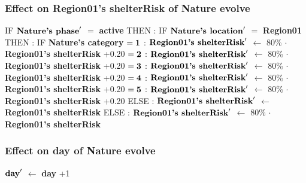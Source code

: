 \documentclass{article}%
\begin{document}
\subsubsection{Effect on Region01's shelterRisk of Nature evolve}%
\label{ssubsec:Effect on Region01's shelterRisk of Nature evolve}%
\begin{flushleft}%
IF %
$\mbox{\textbf{Nature's phase}} '$%
$=$%
\textbf{active}%
\linebreak%
\hspace*{2em}%
THEN %
: %
IF %
$\mbox{\textbf{Nature's location}} '$%
$=$%
\textbf{Region01}%
\linebreak%
\hspace*{4em}%
THEN %
: %
IF %
\textbf{Nature's category}%
\linebreak%
\hspace*{6em}%
$= \mbox{\textbf{1}}$%
: %
$\mbox{\textbf{Region01's shelterRisk}} '$%
$\leftarrow$%
80\%%
$\cdot$%
\textbf{Region01's shelterRisk}%
+0.20%
\linebreak%
\hspace*{6em}%
$= \mbox{\textbf{2}}$%
: %
$\mbox{\textbf{Region01's shelterRisk}} '$%
$\leftarrow$%
80\%%
$\cdot$%
\textbf{Region01's shelterRisk}%
+0.20%
\linebreak%
\hspace*{6em}%
$= \mbox{\textbf{3}}$%
: %
$\mbox{\textbf{Region01's shelterRisk}} '$%
$\leftarrow$%
80\%%
$\cdot$%
\textbf{Region01's shelterRisk}%
+0.20%
\linebreak%
\hspace*{6em}%
$= \mbox{\textbf{4}}$%
: %
$\mbox{\textbf{Region01's shelterRisk}} '$%
$\leftarrow$%
80\%%
$\cdot$%
\textbf{Region01's shelterRisk}%
+0.20%
\linebreak%
\hspace*{6em}%
$= \mbox{\textbf{5}}$%
: %
$\mbox{\textbf{Region01's shelterRisk}} '$%
$\leftarrow$%
80\%%
$\cdot$%
\textbf{Region01's shelterRisk}%
+0.20%
\linebreak%
\hspace*{4em}%
ELSE %
: %
$\mbox{\textbf{Region01's shelterRisk}} '$%
$\leftarrow$%
\textbf{Region01's shelterRisk}%
\linebreak%
\hspace*{2em}%
ELSE %
: %
$\mbox{\textbf{Region01's shelterRisk}} '$%
$\leftarrow$%
80\%%
$\cdot$%
\textbf{Region01's shelterRisk}%
\end{flushleft}

%
\subsubsection{Effect on day of Nature evolve}%
\label{ssubsec:Effect on day of Nature evolve}%
\begin{flushleft}%
$\mbox{\textbf{day}} '$%
$\leftarrow$%
\textbf{day}%
+1%
\end{flushleft}
\end{document}
